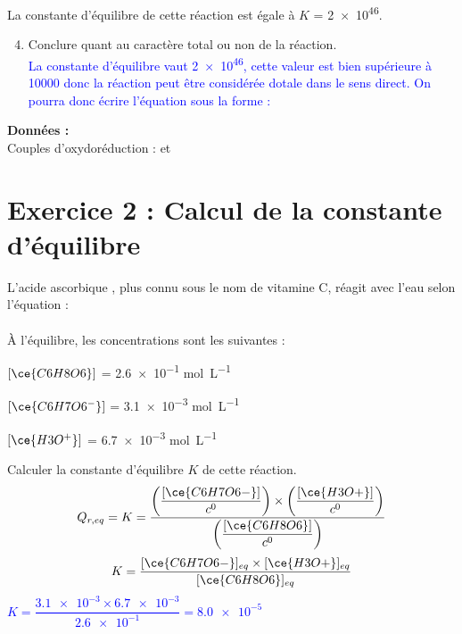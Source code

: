 \documentclass[a4paper,11pt,fleqn]{article}%
\begin{document}
La constante d'équilibre de cette réaction est égale à $K$ = \num{2e46}.
\begin{enumerate}
\setcounter{enumi}{3}
	\item Conclure quant au caractère total ou non de la réaction.\\
	\textcolor{blue}{La constante d'équilibre vaut \num{2e46}, cette valeur est bien supérieure à \num{10000} donc la réaction peut être considérée dotale dans le sens direct. On pourra donc écrire l'équation sous la forme : }
\end{enumerate}
\textbf{Données :}\\
Couples d'oxydoréduction :  et 

\section*{Exercice 2 : Calcul de la constante d'équilibre}
L'acide ascorbique , plus connu sous le nom de vitamine C, réagit avec l'eau selon l'équation : \\
\\
À l'équilibre, les concentrations sont les suivantes :
\begin{itemize*}
	\item $[\ce{C6H8O6}]$ = \num{2,6e-1} \unit{\mole \per \liter}
	\item $[\ce{C6H7O6^{-}}]$ = \num{3,1e-3} \unit{\mole \per \liter}
	\item $[\ce{H3O^{+}}]$ = \num{6,7e-3} \unit{\mole \per \liter}
\end{itemize*}
Calculer la constante d'équilibre $K$ de cette réaction.\\
\textcolor{blue}{ $$ Q_{r,eq} = K =  \dfrac{\left(\dfrac{[\ce{C6H7O6-}]}{c^0}\right) \times \left(\dfrac{[\ce{H3O+}]}{c^0}\right)}{\left(\dfrac{[\ce{C6H8O6}]}{c^0}\right)}$$
$$K =  \dfrac{[\ce{C6H7O6-}]_{eq} \times [\ce{H3O+}]_{eq}}{[\ce{C6H8O6}]_{eq}}$$
 $K =  \dfrac{\num{3,1e-3} \times\num{6,7e-3}}{\num{2,6e-1}} = \num{8.0e-5}$}
\end{document}
